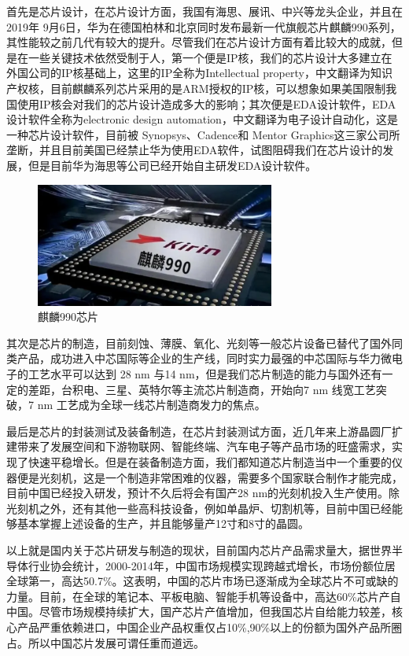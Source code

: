 \documentclass{article}
\begin{document}
首先是芯片设计，在芯片设计方面，我国有海思、展讯、中兴等龙头企业，并且在2019年
9月6日，华为在德国柏林和北京同时发布最新一代旗舰芯片麒麟990系列，其性能较之前几代有较大的提升。尽管我们在芯片设计方面有着比较大的成就，但是在一些关键技术依然受制于人，第一个便是IP核，我们的芯片设计大多建立在外国公司的IP核基础上，这里的IP全称为Intellectual property，中文翻译为知识产权核，目前麒麟系列芯片采用的是ARM授权的IP核，可以想象如果美国限制我国使用IP核会对我们的芯片设计造成多大的影响；其次便是EDA设计软件，EDA设计软件全称为electronic design automation，中文翻译为电子设计自动化，这是一种芯片设计软件，目前被 Synopsys、Cadence和 Mentor Graphics这三家公司所垄断，并且目前美国已经禁止华为使用EDA软件，试图阻碍我们在芯片设计的发展，但是目前华为海思等公司已经开始自主研发EDA设计软件。
\begin{figure}[H]
\centering
\includegraphics[width=0.7\textwidth]{kirin.png}
\caption{麒麟990芯片}
\label{fig:kirin}
\end{figure}
\par

其次是芯片的制造，目前刻蚀、薄膜、氧化、光刻等一般芯片设备已替代了国外同类产品，成功进入中芯国际等企业的生产线，同时实力最强的中芯国际与华力微电子的工艺水平可以达到 28 nm 与14 nm，但是我们芯片制造的能力与国外还有一定的差距，台积电、三星、英特尔等主流芯片制造商，开始向7 nm 线宽工艺突破，7 nm 工艺成为全球一线芯片制造商发力的焦点。\citep{xinpian2}
\par

最后是芯片的封装测试及装备制造，在芯片封装测试方面，近几年来上游晶圆厂扩建带来了发展空间和下游物联网、智能终端、汽车电子等产品市场的旺盛需求，实现了快速平稳增长。但是在装备制造方面，我们都知道芯片制造当中一个重要的仪器便是光刻机，这是一个制造非常困难的仪器，需要多个国家联合制作才能完成，目前中国已经投入研发，预计不久后将会有国产28 nm的光刻机投入生产使用。除光刻机之外，还有其他一些高科技设备，例如单晶炉、切割机等，目前中国已经能够基本掌握上述设备的生产，并且能够量产12寸和8寸的晶圆。
\par

以上就是国内关于芯片研发与制造的现状，目前国内芯片产品需求量大，据世界半导体行业协会统计，2000-2014年，中国市场规模实现跨越式增长，市场份额位居全球第一，高达50.7\%。这表明，中国的芯片市场已逐渐成为全球芯片不可或缺的力量。目前，在全球的笔记本、平板电脑、智能手机等设备中，高达60\%芯片产自中国。尽管市场规模持续扩大，国产芯片产值增加，但我国芯片自给能力较差，核心产品严重依赖进口，中国企业产品权重仅占10\%,90\%以上的份额为国外产品所圈占。所以中国芯片发展可谓任重而道远。
\par
\end{document}
